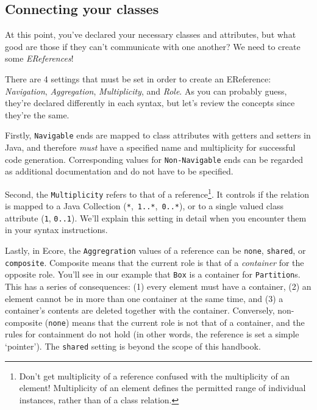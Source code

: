 \newpage
\subsection{Connecting your classes}
\genHeader
\hypertarget{static:references splash}{}

\texttt{}
\emph{}

At this point, you've declared your necessary classes and attributes, but what good are those if they can't communicate with one another? We need to create some
\emph{EReferences}!

There are 4 settings that must be set in order to create an EReference: \emph{Navigation}, \emph{Aggregation}, \emph{Multiplicity}, and \emph{Role}. As you can probably guess,
they're declared differently in each syntax, but let's review the concepts since they're the same.

Firstly, \texttt{Navigable} ends are mapped to class attributes with getters and setters in Java, and therefore \emph{must} have a specified name and
multiplicity for successful code generation. Corresponding values for \texttt{Non-Navigable} ends can  be regarded as additional documentation and do not have
to be specified.

Second, the \texttt{Multiplicity} refers to that of a reference\footnote{Don't get multiplicity of a reference confused with the multiplicity of an element!
Multiplicity of an element defines the permitted range of individual instances, rather than of a class relation.}. It controls if the relation is mapped to a Java Collection
(\texttt{*},~\texttt{1..*},~\texttt{0..*}), or to a single valued class attribute (\texttt{1}, \texttt{0..1}). We'll explain this setting in detail when you
encounter them in your syntax instructions.

Lastly, in Ecore, the \texttt{Aggregration} values of a reference can be \texttt{none}, \texttt{shared}, or \texttt{com\-po\-site}. Composite means that the
current role is that of a \emph{container} for the opposite role. You'll see in our example that \texttt{Box} is a container for \texttt{Partition}s. This has a series of
consequences: (1) every element must have a container, (2) an element cannot be in more than one container at the same time, and (3) a container's contents are
deleted together with the container. Conversely, non-composite (\texttt{none}) means that the current role is not that of a container, and the rules for
containment do not hold (in other words, the reference is set a simple `pointer'). The \texttt{shared} setting is beyond the scope of this handbook.


